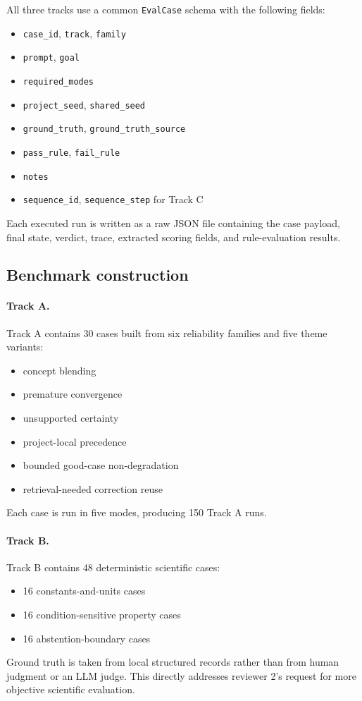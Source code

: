 \documentclass[12pt]{article}
\begin{document}
All three tracks use a common \texttt{EvalCase} schema with the following fields:
\begin{itemize}
\item \texttt{case\_id}, \texttt{track}, \texttt{family}
\item \texttt{prompt}, \texttt{goal}
\item \texttt{required\_modes}
\item \texttt{project\_seed}, \texttt{shared\_seed}
\item \texttt{ground\_truth}, \texttt{ground\_truth\_source}
\item \texttt{pass\_rule}, \texttt{fail\_rule}
\item \texttt{notes}
\item \texttt{sequence\_id}, \texttt{sequence\_step} for Track C
\end{itemize}
Each executed run is written as a raw JSON file containing the case payload, final state, verdict, trace, extracted scoring fields, and rule-evaluation results.

\subsection{Benchmark construction}

\paragraph{Track A.}
Track A contains 30 cases built from six reliability families and five theme variants:
\begin{itemize}
\item concept blending
\item premature convergence
\item unsupported certainty
\item project-local precedence
\item bounded good-case non-degradation
\item retrieval-needed correction reuse
\end{itemize}
Each case is run in five modes, producing 150 Track A runs.

\paragraph{Track B.}
Track B contains 48 deterministic scientific cases:
\begin{itemize}
\item 16 constants-and-units cases
\item 16 condition-sensitive property cases
\item 16 abstention-boundary cases
\end{itemize}
Ground truth is taken from local structured records rather than from human judgment or an LLM judge. This directly addresses reviewer 2's request for more objective scientific evaluation.
\end{document}
